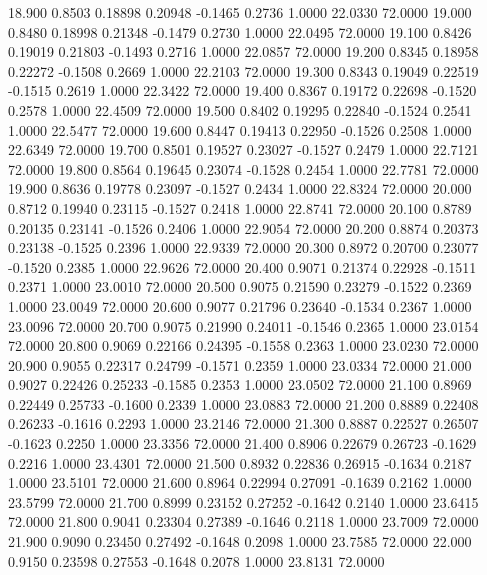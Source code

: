   18.900   0.8503   0.18898   0.20948  -0.1465   0.2736   1.0000  22.0330  72.0000
  19.000   0.8480   0.18998   0.21348  -0.1479   0.2730   1.0000  22.0495  72.0000
  19.100   0.8426   0.19019   0.21803  -0.1493   0.2716   1.0000  22.0857  72.0000
  19.200   0.8345   0.18958   0.22272  -0.1508   0.2669   1.0000  22.2103  72.0000
  19.300   0.8343   0.19049   0.22519  -0.1515   0.2619   1.0000  22.3422  72.0000
  19.400   0.8367   0.19172   0.22698  -0.1520   0.2578   1.0000  22.4509  72.0000
  19.500   0.8402   0.19295   0.22840  -0.1524   0.2541   1.0000  22.5477  72.0000
  19.600   0.8447   0.19413   0.22950  -0.1526   0.2508   1.0000  22.6349  72.0000
  19.700   0.8501   0.19527   0.23027  -0.1527   0.2479   1.0000  22.7121  72.0000
  19.800   0.8564   0.19645   0.23074  -0.1528   0.2454   1.0000  22.7781  72.0000
  19.900   0.8636   0.19778   0.23097  -0.1527   0.2434   1.0000  22.8324  72.0000
  20.000   0.8712   0.19940   0.23115  -0.1527   0.2418   1.0000  22.8741  72.0000
  20.100   0.8789   0.20135   0.23141  -0.1526   0.2406   1.0000  22.9054  72.0000
  20.200   0.8874   0.20373   0.23138  -0.1525   0.2396   1.0000  22.9339  72.0000
  20.300   0.8972   0.20700   0.23077  -0.1520   0.2385   1.0000  22.9626  72.0000
  20.400   0.9071   0.21374   0.22928  -0.1511   0.2371   1.0000  23.0010  72.0000
  20.500   0.9075   0.21590   0.23279  -0.1522   0.2369   1.0000  23.0049  72.0000
  20.600   0.9077   0.21796   0.23640  -0.1534   0.2367   1.0000  23.0096  72.0000
  20.700   0.9075   0.21990   0.24011  -0.1546   0.2365   1.0000  23.0154  72.0000
  20.800   0.9069   0.22166   0.24395  -0.1558   0.2363   1.0000  23.0230  72.0000
  20.900   0.9055   0.22317   0.24799  -0.1571   0.2359   1.0000  23.0334  72.0000
  21.000   0.9027   0.22426   0.25233  -0.1585   0.2353   1.0000  23.0502  72.0000
  21.100   0.8969   0.22449   0.25733  -0.1600   0.2339   1.0000  23.0883  72.0000
  21.200   0.8889   0.22408   0.26233  -0.1616   0.2293   1.0000  23.2146  72.0000
  21.300   0.8887   0.22527   0.26507  -0.1623   0.2250   1.0000  23.3356  72.0000
  21.400   0.8906   0.22679   0.26723  -0.1629   0.2216   1.0000  23.4301  72.0000
  21.500   0.8932   0.22836   0.26915  -0.1634   0.2187   1.0000  23.5101  72.0000
  21.600   0.8964   0.22994   0.27091  -0.1639   0.2162   1.0000  23.5799  72.0000
  21.700   0.8999   0.23152   0.27252  -0.1642   0.2140   1.0000  23.6415  72.0000
  21.800   0.9041   0.23304   0.27389  -0.1646   0.2118   1.0000  23.7009  72.0000
  21.900   0.9090   0.23450   0.27492  -0.1648   0.2098   1.0000  23.7585  72.0000
  22.000   0.9150   0.23598   0.27553  -0.1648   0.2078   1.0000  23.8131  72.0000
